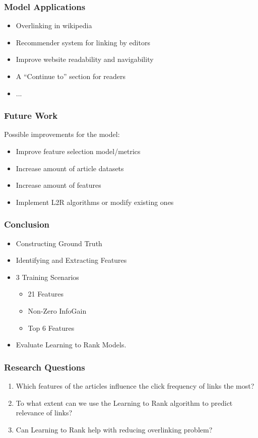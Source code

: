 \begin{frame}
  \frametitle{Model Applications}
  \begin{itemize}
    \item Overlinking in wikipedia
    \item Recommender system for linking by editors
    \item Improve website readability and navigability
    \item A ``Continue to'' section for readers
    \item ...
  \end{itemize}
\end{frame}

\begin{frame}
  \frametitle{Future Work}
  Possible improvements for the model:
  \begin{itemize}
    \item Improve feature selection model/metrics
    \item Increase amount of article datasets
    \item Increase amount of features
    \item Implement L2R algorithms or modify existing ones
  \end{itemize}

\end{frame}



\begin{frame}
  \frametitle{Conclusion}
  \begin{itemize}
    \item Constructing Ground Truth
  	\item Identifying and Extracting Features
    \item 3 Training Scenarios
      \begin{itemize}
    	\item 21 Features
        \item Non-Zero InfoGain
    	\item Top 6 Features
  	   \end{itemize}
    \item Evaluate Learning to Rank Models.
  \end{itemize}

\end{frame}

\begin{frame}
  \frametitle{Research Questions}
  \begin{enumerate}
	\item Which features of the articles influence the click frequency of links the most?
	\item To what extent can we use the Learning to Rank algorithm to predict relevance of links?
	\item Can Learning to Rank help with reducing overlinking problem?
  \end{enumerate}
\end{frame}


